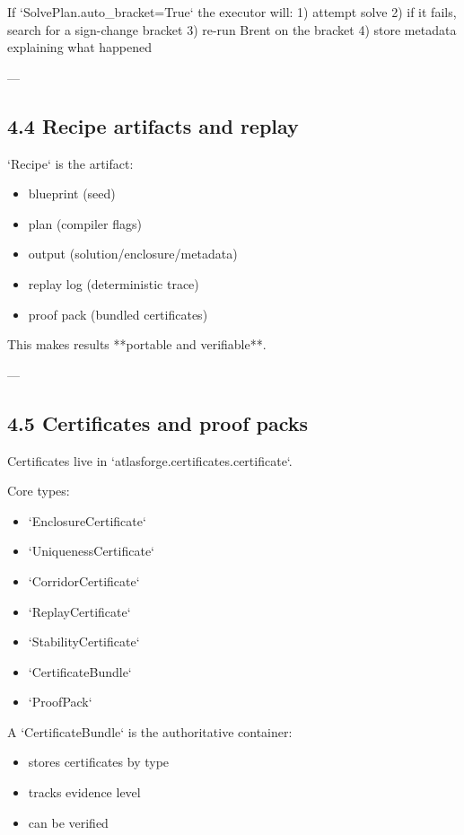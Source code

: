 \documentclass[11pt]{article}
\begin{document}
If `SolvePlan.auto\_bracket=True` the executor will:
1) attempt solve
2) if it fails, search for a sign-change bracket
3) re-run Brent on the bracket
4) store metadata explaining what happened

---

\subsection{4.4 Recipe artifacts and replay}

`Recipe` is the artifact:
\begin{itemize}
\item blueprint (seed)
\item plan (compiler flags)
\item output (solution/enclosure/metadata)
\item replay log (deterministic trace)
\item proof pack (bundled certificates)
\end{itemize}

This makes results **portable and verifiable**.

---

\subsection{4.5 Certificates and proof packs}

Certificates live in `atlasforge.certificates.certificate`.

Core types:

\begin{itemize}
\item `EnclosureCertificate`
\item `UniquenessCertificate`
\item `CorridorCertificate`
\item `ReplayCertificate`
\item `StabilityCertificate`
\item `CertificateBundle`
\item `ProofPack`
\end{itemize}

A `CertificateBundle` is the authoritative container:
\begin{itemize}
\item stores certificates by type
\item tracks evidence level
\item can be verified
\end{itemize}
\end{document}
